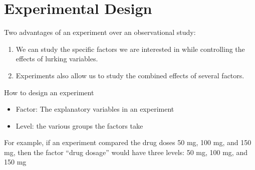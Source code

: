 \documentclass[../stats.tex]{subfiles}
\begin{document}
\section{Experimental Design}
Two advantages of an experiment over an observational study:
\begin{enumerate}
    \item We can study the specific factors we are interested in while controlling the effects of lurking variables.
    \item Experiments also allow us to study the combined effects of several factors.
\end{enumerate}

How to design an experiment 
\begin{itemize}
    \item Factor: The explanatory variables in an experiment
    \item Level: the various groups the factors take 
\end{itemize}

For example, if an experiment compared the drug doses 50 mg, 100 mg, and 150 mg, then the factor ``drug dosage'' would have three levels: 50 mg, 100 mg, and 150 mg 
\end{document}
